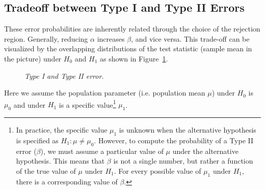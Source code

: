 \documentclass[twoside]{book}
\begin{document}
\subsection{Tradeoff between Type I and Type II Errors}

These error probabilities are inherently related through the choice of the rejection region. Generally, reducing \(\alpha\) increases \(\beta\), and vice versa. This trade-off can be visualized by the overlapping distributions of the test statistic (sample mean in the picture) under \(H_0\) and \(H_1\) as shown in Figure~\ref{fig:type-i_and_type-ii}.

\begin{figure}[H]
	\begin{center}
	\end{center}
	\caption{\textit{Type I and Type II error.}}
	\label{fig:type-i_and_type-ii}
\end{figure}

Here we assume the population parameter (i.e. population mean $\mu$) under $H_0$ is $\mu_0$ and under $H_1$ is a specific value\footnote{In practice, the specific value $\mu_1$ is unknown when the alternative hypothesis is specified as $H_1: \mu \neq \mu_0$. However, to compute the probability of a Type II error ($\beta$), we must assume a particular value of $\mu$ under the alternative hypothesis. This means that $\beta$ is not a single number, but rather a function of the true value of $\mu$ under $H_1$. For every possible value of $\mu_1$ under $H_1$, there is a corresponding value of $\beta$.} $\mu_1$.
\end{document}
